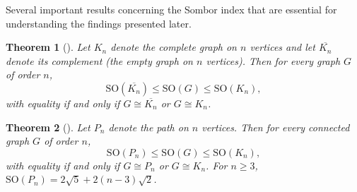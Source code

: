 \documentclass[12pt, a4paper]{article}
\newtheorem{theorem}{Theorem}[section]
\newcommand{\SO}{\mathrm{SO}}
\begin{document}
Several important results concerning the Sombor index that are essential for understanding the findings presented later.

\begin{theorem}[\cite{Gutman2021Geo}]
Let $K_n$ denote the complete graph on $n$ vertices and let $\overline{K_n}$ denote its complement (the empty graph on $n$ vertices). Then for every graph $G$ of order $n$,
$$
\SO(\overline{K_n}) \leq \SO(G) \leq \SO(K_n),
$$
with equality if and only if $G \cong \overline{K_n}$ or $G \cong K_n$.  
\end{theorem}

\begin{theorem}[\cite{Gutman2021Geo,Liu2023GutmanYou}]
Let $P_n$ denote the path on $n$ vertices. Then for every connected graph $G$ of order $n$,
$$
\SO(P_n) \leq \SO(G) \leq \SO(K_n),
$$
with equality if and only if $G \cong P_n$ or $G \cong K_n$. For $n \geq 3$,
$\SO(P_n)=2\sqrt{5} + 2(n-3)\sqrt{2}$.
\end{theorem}
\end{document}
